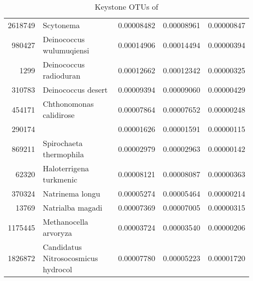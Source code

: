 \begin{table}[ht]
\begin{tabular}{rlrrr}
  2618749 & Scytonema & 0.00008482 & 0.00008961 & 0.00000847 \\ 
  980427 & Deinococcus wulumuqiensi & 0.00014906 & 0.00014494 & 0.00000394 \\ 
  1299 & Deinococcus radioduran & 0.00012662 & 0.00012342 & 0.00000325 \\ 
  310783 & Deinococcus desert & 0.00009394 & 0.00009060 & 0.00000429 \\ 
  454171 & Chthonomonas calidirose & 0.00007864 & 0.00007652 & 0.00000248 \\ 
  290174 &   & 0.00001626 & 0.00001591 & 0.00000115 \\ 
  869211 & Spirochaeta thermophila & 0.00002979 & 0.00002963 & 0.00000142 \\ 
  62320 & Haloterrigena turkmenic & 0.00008121 & 0.00008087 & 0.00000363 \\ 
  370324 & Natrinema longu & 0.00005274 & 0.00005464 & 0.00000214 \\ 
  13769 & Natrialba magadi & 0.00007369 & 0.00007005 & 0.00000315 \\ 
  1175445 & Methanocella arvoryza & 0.00003724 & 0.00003540 & 0.00000206 \\ 
  1826872 & Candidatus Nitrosocosmicus hydrocol & 0.00007780 & 0.00005223 & 0.00001720 \\ 
   \hline
\end{tabular}
\caption{Keystone OTUs of } 
\end{table}
